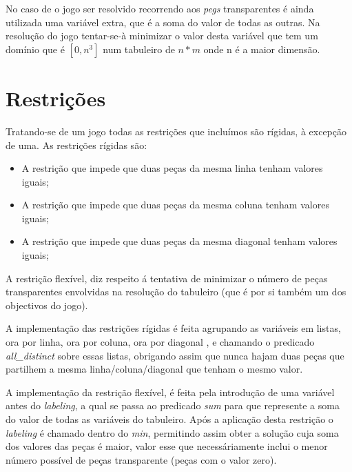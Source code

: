 \documentclass{llncs}
\begin{document}
No caso de o jogo ser resolvido recorrendo aos \emph{pegs} transparentes \'{e} ainda utilizada uma vari\'{a}vel extra, que \'{e} a soma do valor de todas as outras. Na resolu\c{c}\~{a}o do jogo tentar-se-\`{a} minimizar o valor desta vari\'{a}vel que tem um dom\'{i}nio que \'{e} $[0,n^3]$ num tabuleiro de $n * m$ onde n \'{e} a maior dimens\~{a}o. 

\section{Restri\c{c}\~{o}es}

Tratando-se de um jogo todas as restri\c{c}\~{o}es que inclu\'{i}mos s\~{a}o r\'{i}gidas, \`{a} excep\c{c}\~{a}o de uma.
As restri\c{c}\~{o}es r\'{i}gidas s\~{a}o:

\begin{itemize}
\item A restri\c{c}\~{a}o que impede que duas pe\c{c}as da mesma linha tenham valores iguais;
\item A restri\c{c}\~{a}o que impede que duas pe\c{c}as da mesma coluna tenham valores iguais;
\item A restri\c{c}\~{a}o que impede que duas pe\c{c}as da mesma diagonal tenham valores iguais;
\end{itemize}

A restri\c{c}\~{a}o flex\'{i}vel, diz respeito \'{a} tentativa de minimizar o n\'{u}mero de pe\c{c}as transparentes envolvidas na resolu\c{c}\~{a}o do tabuleiro (que \'{e} por si tamb\'{e}m um dos objectivos do jogo).

A implementa\c{c}\~{a}o das restri\c{c}\~{o}es r\'{i}gidas \'{e} feita agrupando as vari\'{a}veis em listas, ora por linha, ora por coluna, ora por diagonal , e chamando o predicado \emph{all\_distinct} sobre essas listas, obrigando assim que nunca hajam duas pe\c{c}as que partilhem a mesma linha/coluna/diagonal que tenham o mesmo valor.

A implementa\c{c}\~{a}o da restri\c{c}\~{a}o flex\'{i}vel, \'{e} feita pela introdu\c{c}\~{a}o de uma vari\'{a}vel antes do \emph{labeling}, a qual se passa ao predicado \emph{sum} para que represente a soma do valor de todas as vari\'{a}veis do tabuleiro. Ap\'{o}s a aplica\c{c}\~{a}o desta restri\c{c}\~{a}o o \emph{labeling} \'{e} chamado dentro do \emph{min}, permitindo assim obter a solu\c{c}\~{a}o cuja soma dos valores das pe\c{c}as \'{e} maior, valor esse que necess\'{a}riamente inclui o menor n\'{u}mero poss\'{i}vel de pe\c{c}as transparente (pe\c{c}as com o valor zero).
\end{document}
